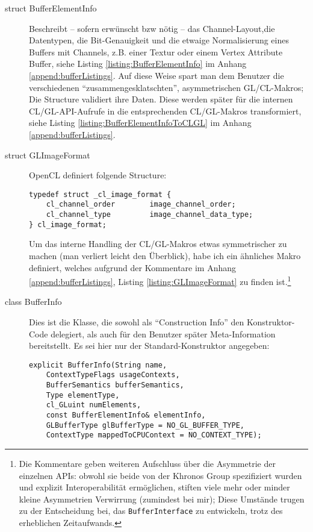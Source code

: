\begin{description}
		\item[struct BufferElementInfo] 
		Beschreibt -- sofern erwünscht bzw nötig -- das Channel-Layout,die Datentypen, die Bit-Genauigkeit
		und die etwaige Normalisierung eines Buffers mit Channels, 
		z.B. einer Textur oder einem Vertex Attribute Buffer,
		siehe Listing \ref{listing:BufferElementInfo} im Anhang \ref{append:bufferListings}.
		Auf diese Weise spart man dem Benutzer die verschiedenen "`zusammengesklatschten"', asymmetrischen GL/CL-Makros;
		Die Structure validiert ihre Daten. Diese werden später für die internen CL/GL-API-Aufrufe in die
		entsprechenden CL/GL-Makros transformiert,
		siehe Listing \ref{listing:BufferElementInfoToCLGL} im Anhang \ref{append:bufferListings}.
		
		\item[struct GLImageFormat]
		OpenCL definiert folgende Structure:
		
		\begin{lstlisting}		
typedef struct _cl_image_format {
    cl_channel_order        image_channel_order;
    cl_channel_type         image_channel_data_type;
} cl_image_format;	
		\end{lstlisting}
		
		Um das interne Handling der CL/GL-Makros etwas symmetrischer zu machen (man verliert leicht den Überblick),
		habe ich ein ähnliches Makro definiert, welches aufgrund der Kommentare im Anhang  \ref{append:bufferListings},
		Listing \ref{listing:GLImageFormat} zu finden ist.\footnote{Die Kommentare geben weiteren Aufschluss über 
		die Asymmetrie der einzelnen APIs: obwohl sie beide von der Khronos Group spezifiziert wurden und explizit 	
		Interoperabilität ermöglichen, stiften viele mehr oder minder kleine Asymmetrien Verwirrung (zumindest bei mir);
		Diese Umstände trugen zu der Entscheidung bei, das \lstinline|BufferInterface| zu entwickeln, trotz des
		erheblichen Zeitaufwands.}
		
		
		\item[class BufferInfo]
		Dies ist die Klasse, die sowohl als "`Construction Info"' den Konstruktor-Code delegiert, als auch für 
		den Benutzer später Meta-Information bereitstellt.
		Es sei hier nur der Standard-Konstruktor angegeben:
		
		\begin{lstlisting}	
explicit BufferInfo(String name,
	ContextTypeFlags usageContexts,
	BufferSemantics bufferSemantics,
	Type elementType,
	cl_GLuint numElements,
	const BufferElementInfo& elementInfo,
	GLBufferType glBufferType = NO_GL_BUFFER_TYPE,
	ContextType mappedToCPUContext = NO_CONTEXT_TYPE);
		\end{lstlisting}
		

\end{description}
